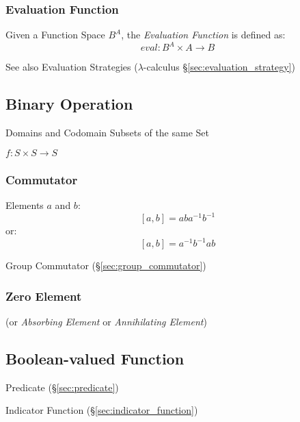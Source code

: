 \subsubsection{Evaluation Function}\label{sec:evaluation_function}

Given a Function Space $B^A$, the \emph{Evaluation Function} is
defined as:
\[
  eval : B^A \times A \rightarrow B
\]

\fist See also Evaluation Strategies ($\lambda$-calculus
\S\ref{sec:evaluation_strategy})



\subsection{Binary Operation}\label{sec:binary_operation}

Domains and Codomain Subsets of the same Set

$f : S \times S \rightarrow S$



\subsubsection{Commutator}\label{sec:commutator}

Elements $a$ and $b$:
\[
  [a,b] = aba^{-1}b^{-1}
\]
or:
\[
  [a,b] = a^{-1}b^{-1}ab
\]

Group Commutator (\S\ref{sec:group_commutator})



\subsubsection{Zero Element}\label{sec:zero_element}

(or \emph{Absorbing Element} or \emph{Annihilating Element})



\subsection{Boolean-valued Function}\label{sec:boolean_function}

Predicate (\S\ref{sec:predicate})

Indicator Function (\S\ref{sec:indicator_function})

